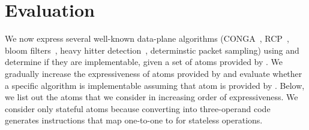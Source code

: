 \section{Evaluation}
\label{s:eval}






We now express several well-known data-plane algorithms (CONGA~\cite{conga},
RCP~\cite{rcp}, bloom filters~\cite{bloom}, heavy hitter
detection~\cite{opensketch}, determinstic packet sampling) using \pktlanguage
and determine if they are implementable, given a set of atoms provided by
\absmachine. We gradually increase the expressiveness of atoms provided by
\pktlanguage and evaluate whether a specific algorithm is implementable
assuming that atom is provided by \absmachine. Below, we list out the atoms
that we consider in increasing order of expressiveness. We consider only
stateful atoms because converting into three-operand code generates
instructions that map one-to-one to \absmachine for stateless operations.

